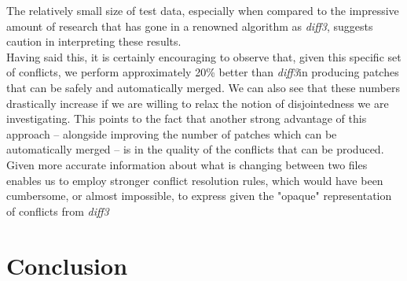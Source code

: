 \documentclass[11pt, titlepage]{article}
\newcommand{\diffthree}{\emph{diff3}}
\begin{document}
The relatively small size of test data, especially when compared to the impressive amount of research that has gone in a renowned algorithm as \emph{diff3}, suggests caution in interpreting these results. \\
Having said this, it is certainly encouraging to observe that, given this specific set of conflicts, we perform approximately 20\% better than \diffthree in producing patches that can be safely and automatically merged. We can also see that these numbers drastically increase if we are willing to relax the notion of disjointedness we are investigating. This points to the fact that another strong advantage of this approach -- alongside improving the number of patches which can be automatically merged -- is in the quality of the conflicts that can be produced. Given more accurate information about what is changing between two files enables us to employ stronger conflict resolution rules, which would have been cumbersome, or almost impossible, to express given the "opaque" representation of conflicts from \diffthree
\section{Conclusion}
\end{document}

